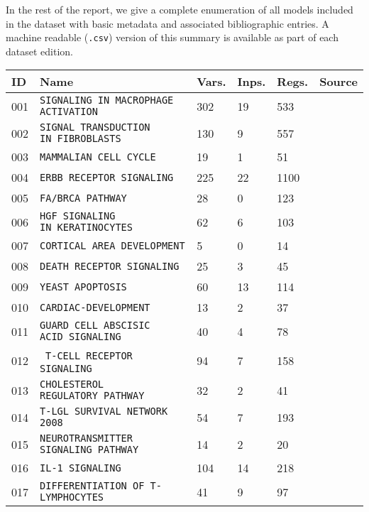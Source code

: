 \documentclass{article}
\begin{document}
In the rest of the report, we give a complete enumeration of all models included in the dataset with basic metadata and associated bibliographic entries. A machine readable (\texttt{.csv}) version of this summary is available as part of each dataset edition.

\begin{center}
	\begin{tabular}{ | C{16pt} | C{144pt} | C{25pt} | C{25pt} | C{25pt} | C{36pt} | }
		\hline
		ID & Name & Vars. & Inps. & Regs. & Source \\  & \texttt{SIGNALING IN MACROPHAGE ACTIVATION} & 302 & 19 & 533 & \cite{bbm-001} \\  & \texttt{SIGNAL TRANSDUCTION IN~FIBROBLASTS} & 130 & 9 & 557 & \cite{bbm-002} \\  & \texttt{MAMMALIAN CELL CYCLE} & 19 & 1 & 51 & \cite{bbm-003} \\  & \texttt{ERBB RECEPTOR SIGNALING} & 225 & 22 & 1100 & \cite{bbm-004}  \\  & \texttt{FA/BRCA PATHWAY} & 28 & 0 & 123 & \cite{bbm-005} \\  & \texttt{HGF SIGNALING IN~KERATINOCYTES} & 62 & 6 & 103 & \cite{bbm-006} \\  & \texttt{CORTICAL AREA DEVELOPMENT} & 5 & 0 & 14 & \cite{bbm-007} \\  & \texttt{DEATH RECEPTOR SIGNALING} & 25 & 3 & 45 & \cite{bbm-008-150} \\  & \texttt{YEAST APOPTOSIS} & 60 & 13 & 114 & \cite{bbm-009} \\  & \texttt{CARDIAC-DEVELOPMENT} & 13 & 2 & 37 & \cite{bbm-010} \\  & \texttt{GUARD CELL ABSCISIC ACID~SIGNALING} & 40 & 4 & 78 & \cite{bbm-011} \\  & \texttt{T-CELL RECEPTOR SIGNALING} & 94 & 7 & 158 & \cite{bbm-012} \\  & \texttt{CHOLESTEROL REGULATORY~PATHWAY} & 32 & 2 & 41 & \cite{bbm-013} \\  & \texttt{T-LGL SURVIVAL NETWORK 2008} & 54 & 7 & 193 & \cite{bbm-014} \\  & \texttt{NEUROTRANSMITTER SIGNALING~PATHWAY} & 14 & 2 & 20 & \cite{bbm-015} \\  & \texttt{IL-1 SIGNALING} & 104 & 14 & 218 & \cite{bbm-016-019} \\  & \texttt{DIFFERENTIATION OF T-LYMPHOCYTES}  & 41 & 9 & 97 & \cite{bbm-017} \\ \hline

\end{tabular}
\end{center}
\end{document}
